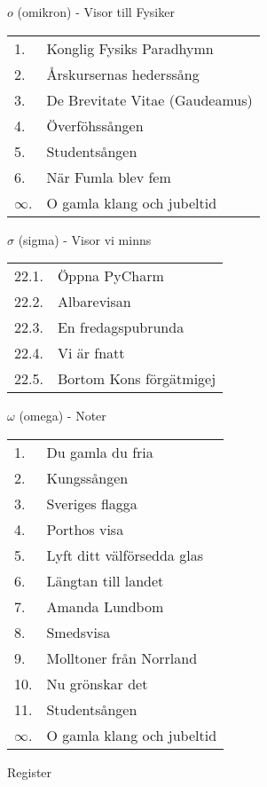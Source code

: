 \documentclass[a6paper,10pt]{article}
\begin{document}
\noindent
\Large $o$ (omikron) - Visor till Fysiker
\vspace{-5pt}
\begin{table}[!h]
\begin{tabularx}{1\textwidth}{l X}
1.&Konglig Fysiks Paradhymn\\
2.&Årskursernas hederssång\\
3.&De Brevitate Vitae (Gaudeamus)\\
4.&Överföhssången\\
5.&Studentsången\\
6.&När Fumla blev fem\\
$\infty$.&O gamla klang och jubeltid
\end{tabularx}
\end{table}

\noindent


\newpage
\noindent
\Large $\sigma$ (sigma) - Visor vi minns
\vspace{-5pt}
\begin{table}[!h]
\begin{tabularx}{1\textwidth}{l X}
22.1.&Öppna PyCharm\\
22.2.&Albarevisan\\
22.3.&En fredagspubrunda\\
22.4.&Vi är fnatt\\
22.5.&Bortom Kons förgätmigej
\end{tabularx}
\end{table}

\Large $\omega$ (omega) - Noter
\vspace{-5pt}
\begin{table}[!h]
\begin{tabularx}{1\textwidth}{l X}
1.&Du gamla du fria\\
2.&Kungssången\\
3.&Sveriges flagga\\
4.&Porthos visa\\
5.&Lyft ditt välförsedda glas\\
6.&Längtan till landet\\
7.&Amanda Lundbom\\
8.&Smedsvisa\\
9.&Molltoner från Norrland\\
10.&Nu grönskar det\\
11.&Studentsången\\
$\infty$.&O gamla klang och jubeltid
\end{tabularx}
\end{table}


\noindent
\Large Register
\end{document}
